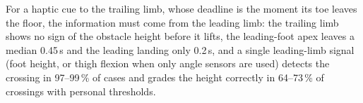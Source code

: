 For a haptic cue to the trailing limb, whose deadline is the moment its toe leaves the floor, the information must come from the
leading limb: the trailing limb shows no sign of the obstacle height before it lifts, the leading-foot apex leaves a median 0.45\,s
and the leading landing only 0.2\,s, and a single leading-limb signal (foot height, or thigh flexion when only angle sensors are used)
detects the crossing in 97--99\,\% of cases and grades the height correctly in 64--73\,\% of crossings with personal thresholds.
